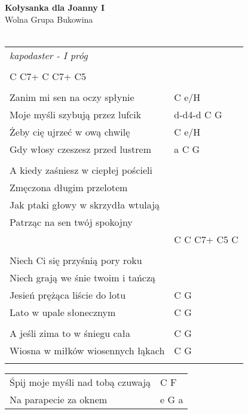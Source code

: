 \documentclass[a5paper]{article}
\begin{document}


\noindent
\fontsize{12pt}{15pt}\selectfont
\textbf{Kołysanka dla Joanny I} \\
\fontsize{8pt}{10pt}\selectfont
Wolna Grupa Bukowina \\ \\
\fontsize{10pt}{12pt}\selectfont
{}
\begin{tabular}{@{}p{8.00cm}p{3cm}@{}}
\noindent
\emph{kapodaster - I próg} \\ \\

C C7+ C C7+ C5 \\ \\

Zanim mi sen na oczy spłynie & C e/H \\
Moje myśli szybują przez lufcik & d-d4-d C G \\
Żeby cię ujrzeć w ową chwilę & C e/H \\
Gdy włosy czeszesz przed lustrem & a C G \\ \\

A kiedy zaśniesz w ciepłej pościeli \\
Zmęczona długim przelotem \\
Jak ptaki głowy w skrzydła wtulają \\
Patrząc na sen twój spokojny \\
& C C C7+ C5 C \\ \\

Niech Ci się przyśnią pory roku \\
Niech grają we śnie twoim i tańczą \\
Jesień prężąca liście do lotu & C G \\
Lato w upale słonecznym & C G \\ \\

A jeśli zima to w śniegu cała & C G \\
Wiosna w miłków wiosennych łąkach & C G \\ \\
\end{tabular}

\noindent
\begin{tabular}{@{}p{7.00cm}p{3cm}@{}}
Śpij moje myśli nad tobą czuwają & C F \\
Na parapecie za oknem & e G a
\end{tabular}
\end{document}
